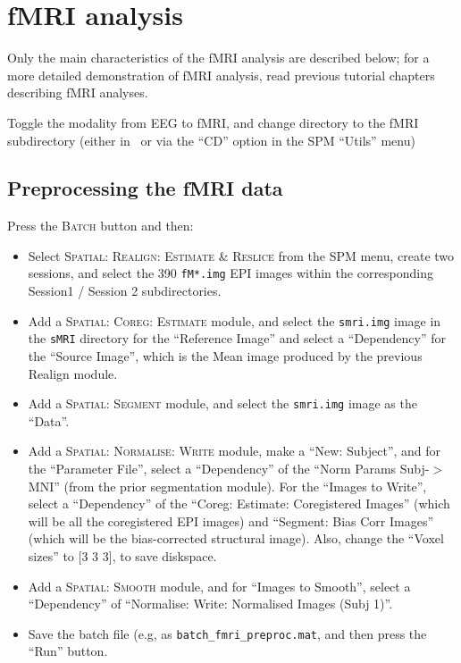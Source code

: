 \section{fMRI analysis \label{multimodal:data:fMRI}}

Only the main characteristics of the fMRI analysis are described below; for a more detailed demonstration of fMRI analysis, read previous tutorial chapters describing fMRI analyses.

Toggle the modality from EEG to fMRI, and change directory to the fMRI subdirectory (either in \matlab\, or via the ``CD'' option in the SPM ``Utils'' menu)

\subsection{Preprocessing the fMRI data}

Press the \textsc{Batch} button and then:

\begin{itemize}
\item Select \textsc{Spatial: Realign: Estimate \& Reslice} from the SPM menu, create two sessions, and select the 390 \texttt{fM*.img} EPI images within the corresponding Session1 / Session 2 subdirectories.

\item Add a \textsc{Spatial: Coreg: Estimate} module, and select the \texttt{smri.img} image in the \texttt{sMRI} directory for the ``Reference Image'' and select a ``Dependency'' for the ``Source Image'', which is the Mean image produced by the previous Realign module.

\item Add a \textsc{Spatial: Segment} module, and select the \texttt{smri.img} image as the ``Data''.

\item Add a \textsc{Spatial: Normalise: Write} module, make a ``New: Subject'', and for the ``Parameter File'', select a ``Dependency'' of the ``Norm Params Subj-$>$MNI'' (from the prior segmentation module). For the ``Images to Write'', select a ``Dependency'' of the ``Coreg: Estimate: Coregistered Images'' (which will be all the coregistered EPI images) and ``Segment: Bias Corr Images'' (which will be the bias-corrected structural image). Also, change the ``Voxel sizes'' to [3 3 3], to save diskspace.

\item Add a \textsc{Spatial: Smooth} module, and for ``Images to Smooth'', select a ``Dependency'' of ``Normalise: Write: Normalised Images (Subj 1)''.

\item Save the batch file (e.g, as \texttt{batch\_fmri\_preproc.mat}, and then press the ``Run'' button.
\end{itemize}

